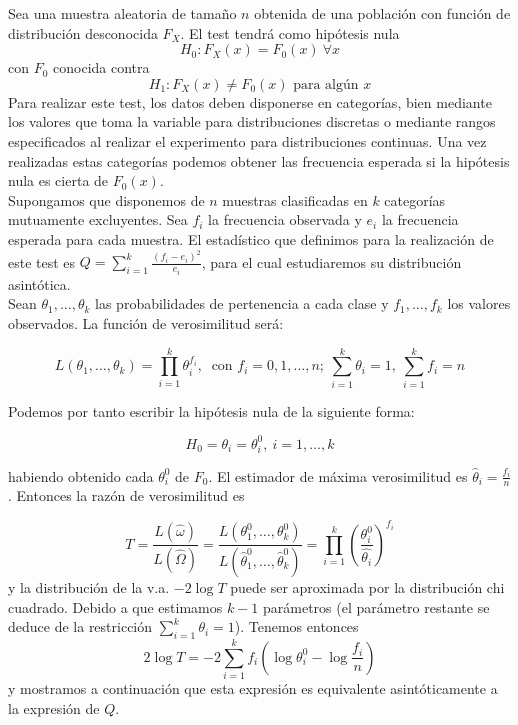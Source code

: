 	Sea una muestra aleatoria de tamaño $n$ obtenida de una 
población con función de distribución desconocida $F_X$. El 
test tendrá como hipótesis nula
		\[ H_0: F_X(x) = F_0(x) \ \forall x \]
	con $F_0$ conocida contra
		\[ H_1: F_X(x) \neq F_0(x) \text{ para algún }  x \]
	Para realizar este test, los datos deben disponerse en
categorías, bien mediante los valores que toma la variable 
para distribuciones discretas o mediante rangos especificados 
al realizar el experimento para distribuciones continuas. Una 
vez realizadas estas categorías podemos obtener las 
frecuencia esperada si la hipótesis nula es cierta de 
$F_0(x)$.\\
	
	Supongamos que disponemos de $n$ muestras clasificadas en 
$k$ categorías mutuamente excluyentes. Sea $f_i$ la 
frecuencia observada y $e_i$ la frecuencia esperada para cada 
muestra. El estadístico que definimos para la realización de 
este test es $Q = \sum\limits_{i=1}^k 
\frac{(f_i-e_i)^2}{e_i}$, para el cual estudiaremos su 
distribución asintótica.\\
	
	Sean $\theta_1, \dots, \theta_k$ las probabilidades de 
pertenencia a cada clase y $f_1, \dots, f_k$ los valores 
observados. La función de verosimilitud será:
	
	\[ L(\theta_1, \dots, \theta_k) = 
			\prod\limits_{i=1}^k \theta_i^{f_i},\			
	   \text{ con } f_i = 0, 1, \dots, n; \
	   \sum\limits_{i=1}^k \theta_i = 1, \
	   \sum\limits_{i=1}^k f_i = n
	 \]
	 
	Podemos por tanto escribir la hipótesis nula de la 
siguiente forma:
	 
	\[ H_0 = \theta_i = \theta_i^0,\ i = 1, \dots, k \]
	 
	habiendo obtenido cada $\theta_i^0$ de $F_0$. El 
estimador de máxima verosimilitud es $\hat{\theta}_i = 
\frac{f_i}{n}$. Entonces la razón de verosimilitud es
	 
	 \[ 
	 T = \frac{L(\hat{\omega})}{L(\hat{\Omega})}
	   = \frac{L(\theta_1^0, \dots, \theta_k^0)}
	   		{L(\hat{\theta}_1^0, \dots, \hat{\theta}_k^0)}
	   = \prod\limits_{i=1}^k
	   		\left( 
	 			\frac{\theta_i^0}{\hat{\theta_i}} 
	 		\right)^{f_i}
	 \]
	 y la distribución de la v.a. $-2 \log T$ puede ser 
aproximada por la distribución chi cuadrado. Debido a que 
estimamos $k-1$ parámetros (el parámetro restante se deduce 
de la restricción $\sum\limits_{i=1}^k \theta_i = 1$). 
Tenemos entonces
	 \begin{equation}
	 2 \log T = 
	 		-2 \sum\limits_{i=1}^k
	 			f_i \left(
	 					\log \theta_i^0 - \log \frac{f_i}{n}
	 				\right)
	 \label{2logT}
	 \end{equation}
	y mostramos a continuación que esta expresión es 
equivalente asintóticamente a la expresión de $Q$.\\
	
